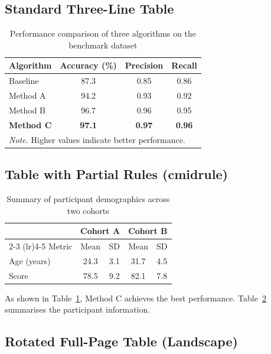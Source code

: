 \subsection{Standard Three-Line Table}

\begin{table}[htbp!]
  \centering
  \caption{Performance comparison of three algorithms on the benchmark
           dataset}
  \label{tab:performance}
  \begin{tabular}{lccc}
    \toprule
    Algorithm & Accuracy (\%) & Precision & Recall \\
    \midrule
    Baseline   & 87.3 & 0.85 & 0.86 \\
    Method A   & 94.2 & 0.93 & 0.92 \\
    Method B   & 96.7 & 0.96 & 0.95 \\
    \textbf{Method C} & \textbf{97.1} & \textbf{0.97} & \textbf{0.96} \\
    \bottomrule
    \multicolumn{4}{l}{\small\textit{Note.} Higher values indicate better performance.}
  \end{tabular}
\end{table}

\subsection{Table with Partial Rules (cmidrule)}

\begin{table}[htbp!]
  \centering
  \caption{Summary of participant demographics across two cohorts}
  \label{tab:demographics}
  \begin{tabular}{lcccc}
    \toprule
    & \multicolumn{2}{c}{Cohort A} & \multicolumn{2}{c}{Cohort B} \\
    \cmidrule(lr){2-3} \cmidrule(lr){4-5}
    Metric  & Mean  & SD    & Mean  & SD \\
    \midrule
    Age (years)  & 24.3 & 3.1 & 31.7 & 4.5 \\
    Score        & 78.5 & 9.2 & 82.1 & 7.8 \\
    \bottomrule
  \end{tabular}
\end{table}

As shown in Table~\ref{tab:performance}, Method C achieves the best
performance. Table~\ref{tab:demographics} summarises the participant
information.

\subsection{Rotated Full-Page Table (Landscape)}

